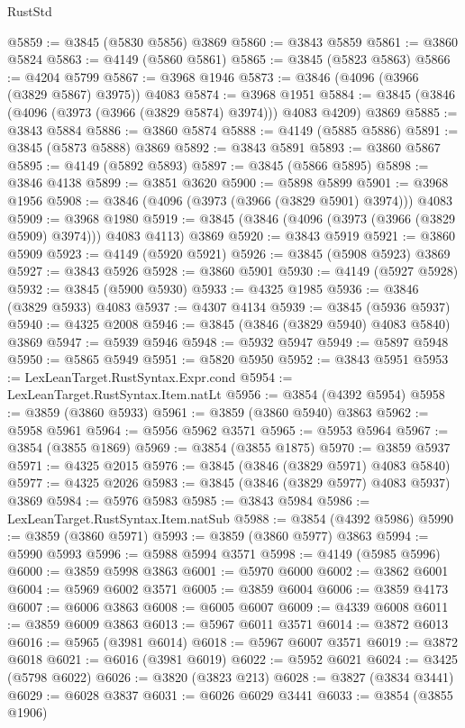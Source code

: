 \begin{lexlean}{RustStd}
\begin{coremodule}
@5859 := @3845 (@5830 @5856) @3869
@5860 := @3843 @5859
@5861 := @3860 @5824
@5863 := @4149 (@5860 @5861)
@5865 := @3845 (@5823 @5863)
@5866 := @4204 @5799
@5867 := @3968 @1946
@5873 := @3846 (@4096 (@3966 (@3829 @5867) @3975)) @4083
@5874 := @3968 @1951
@5884 := @3845 (@3846 (@4096 (@3973 (@3966 (@3829 @5874) @3974))) @4083 @4209) @3869
@5885 := @3843 @5884
@5886 := @3860 @5874
@5888 := @4149 (@5885 @5886)
@5891 := @3845 (@5873 @5888) @3869
@5892 := @3843 @5891
@5893 := @3860 @5867
@5895 := @4149 (@5892 @5893)
@5897 := @3845 (@5866 @5895)
@5898 := @3846 @4138
@5899 := @3851 @3620
@5900 := @5898 @5899
@5901 := @3968 @1956
@5908 := @3846 (@4096 (@3973 (@3966 (@3829 @5901) @3974))) @4083
@5909 := @3968 @1980
@5919 := @3845 (@3846 (@4096 (@3973 (@3966 (@3829 @5909) @3974))) @4083 @4113) @3869
@5920 := @3843 @5919
@5921 := @3860 @5909
@5923 := @4149 (@5920 @5921)
@5926 := @3845 (@5908 @5923) @3869
@5927 := @3843 @5926
@5928 := @3860 @5901
@5930 := @4149 (@5927 @5928)
@5932 := @3845 (@5900 @5930)
@5933 := @4325 @1985
@5936 := @3846 (@3829 @5933) @4083
@5937 := @4307 @4134
@5939 := @3845 (@5936 @5937)
@5940 := @4325 @2008
@5946 := @3845 (@3846 (@3829 @5940) @4083 @5840) @3869
@5947 := @5939 @5946
@5948 := @5932 @5947
@5949 := @5897 @5948
@5950 := @5865 @5949
@5951 := @5820 @5950
@5952 := @3843 @5951
@5953 := LexLeanTarget.RustSyntax.Expr.cond
@5954 := LexLeanTarget.RustSyntax.Item.natLt
@5956 := @3854 (@4392 @5954)
@5958 := @3859 (@3860 @5933)
@5961 := @3859 (@3860 @5940) @3863
@5962 := @5958 @5961
@5964 := @5956 @5962 @3571
@5965 := @5953 @5964
@5967 := @3854 (@3855 @1869)
@5969 := @3854 (@3855 @1875)
@5970 := @3859 @5937
@5971 := @4325 @2015
@5976 := @3845 (@3846 (@3829 @5971) @4083 @5840)
@5977 := @4325 @2026
@5983 := @3845 (@3846 (@3829 @5977) @4083 @5937) @3869
@5984 := @5976 @5983
@5985 := @3843 @5984
@5986 := LexLeanTarget.RustSyntax.Item.natSub
@5988 := @3854 (@4392 @5986)
@5990 := @3859 (@3860 @5971)
@5993 := @3859 (@3860 @5977) @3863
@5994 := @5990 @5993
@5996 := @5988 @5994 @3571
@5998 := @4149 (@5985 @5996)
@6000 := @3859 @5998 @3863
@6001 := @5970 @6000
@6002 := @3862 @6001
@6004 := @5969 @6002 @3571
@6005 := @3859 @6004
@6006 := @3859 @4173
@6007 := @6006 @3863
@6008 := @6005 @6007
@6009 := @4339 @6008
@6011 := @3859 @6009 @3863
@6013 := @5967 @6011 @3571
@6014 := @3872 @6013
@6016 := @5965 (@3981 @6014)
@6018 := @5967 @6007 @3571
@6019 := @3872 @6018
@6021 := @6016 (@3981 @6019)
@6022 := @5952 @6021
@6024 := @3425 (@5798 @6022)
@6026 := @3820 (@3823 @213)
@6028 := @3827 (@3834 @3441)
@6029 := @6028 @3837
@6031 := @6026 @6029 @3441
@6033 := @3854 (@3855 @1906)

\end{coremodule}
\end{lexlean}
